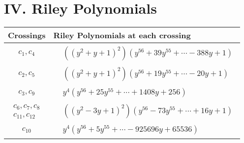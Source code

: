 \documentclass[1p]{elsarticle_modified}
\theoremstyle{definition}
\begin{document}
\centering \section*{ IV. Riley Polynomials}
\begin{tabular}{m{50pt}|m{274pt}}
Crossings & \hspace{64pt}Riley Polynomials at each crossing \\
\hline $$\begin{aligned}c_{1},c_{4}\end{aligned}$$&$\begin{aligned}
&((y^2+y+1)^2)(y^{56}+39 y^{55}+\cdots-388 y+1)
\end{aligned}$\\
\hline $$\begin{aligned}c_{2},c_{5}\end{aligned}$$&$\begin{aligned}
&((y^2+y+1)^2)(y^{56}+19 y^{55}+\cdots-20 y+1)
\end{aligned}$\\
\hline $$\begin{aligned}c_{3},c_{9}\end{aligned}$$&$\begin{aligned}
&y^4(y^{56}+25 y^{55}+\cdots+1408 y+256)
\end{aligned}$\\
\hline $$\begin{aligned}c_{6},c_{7},c_{8}\\c_{11},c_{12}\end{aligned}$$&$\begin{aligned}
&((y^2-3 y+1)^2)(y^{56}-73 y^{55}+\cdots+16 y+1)
\end{aligned}$\\
\hline $$\begin{aligned}c_{10}\end{aligned}$$&$\begin{aligned}
&y^4(y^{56}+5 y^{55}+\cdots-925696 y+65536)
\end{aligned}$\\
\hline
\end{tabular}
\vskip 2pc
\end{document}

